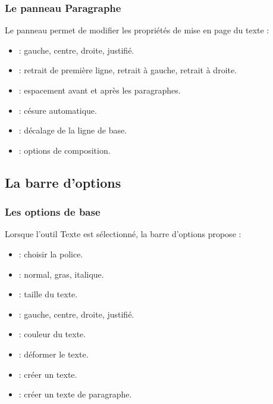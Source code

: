 \subsubsection{Le panneau Paragraphe}

Le panneau  permet de modifier les propriétés de mise en page du texte :

\begin{itemize}
    \item {} : gauche, centre, droite, justifié.
    \item {} : retrait de première ligne, retrait à gauche, retrait à droite.
    \item {} : espacement avant et après les paragraphes.
    \item {} : césure automatique.
    \item {} : décalage de la ligne de base.
    \item {} : options de composition.
\end{itemize}

\subsection{La barre d'options}

\subsubsection{Les options de base}

Lorsque l'outil Texte est sélectionné, la barre d'options propose :

\begin{itemize}
    \item {} : choisir la police.
    \item {} : normal, gras, italique.
    \item {} : taille du texte.
    \item {} : gauche, centre, droite, justifié.
    \item {} : couleur du texte.
    \item {} : déformer le texte.
    \item {} : créer un texte.
    \item {} : créer un texte de paragraphe.
\end{itemize}

